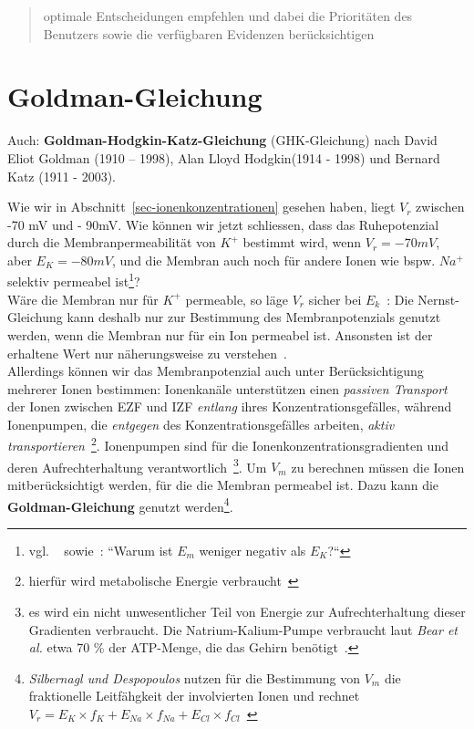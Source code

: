 {\blockquote[{\cite[737]{RN09}}]{
    optimale Entscheidungen empfehlen und dabei die Prioritäten des Benutzers sowie die verfügbaren Evidenzen berücksichtigen
}


\section{Goldman-Gleichung}\label{appendix:goldman}

Auch: \textbf{Goldman-Hodgkin-Katz-Gleichung} (GHK-Gleichung) nach David Eliot Goldman (1910 – 1998), Alan Lloyd Hodgkin(1914 - 1998) und Bernard Katz (1911 - 2003).

Wie wir in Abschnitt~\ref{sec-ionenkonzentrationen} gesehen haben, liegt $V_r$ zwischen -70 mV und - 90mV. Wie können wir jetzt schliessen, dass das Ruhepotenzial durch die Membranpermeabilität von $K^+$ bestimmt wird, wenn $V_r = -70 mV$, aber $E_K = -80 mV$, und die Membran auch noch für andere Ionen wie bspw. $Na^+$ selektiv permeabel ist\footnote{
    vgl. ~\cite[77]{BCP18} sowie~\cite[44]{SD07}: ``Warum ist $E_m$ weniger negativ als $E_K${?}``
}? \\
Wäre die Membran nur für $K^+$ permeable, so läge $V_r$ sicher bei $E_k$~\cite[32]{SD07}: Die Nernst-Gleichung kann deshalb nur zur Bestimmung des Membranpotenzials genutzt werden, wenn die Membran nur für ein Ion permeabel ist. Ansonsten ist der erhaltene Wert nur näherungsweise zu verstehen~\cite[67]{FE19}.\\

Allerdings können wir das Membranpotenzial auch unter Berücksichtigung mehrerer Ionen bestimmen: Ionenkanäle unterstützen einen \textit{passiven Transport} der Ionen zwischen EZF und IZF \textit{entlang} ihres Konzentrationsgefälles, während Ionenpumpen, die \textit{entgegen} des Konzentrationsgefälles arbeiten, \textit{aktiv transportieren}~\cite[30]{Fro19}\footnote{
    hierfür wird metabolische Energie verbraucht~\cite[31]{Fro19}
}.
Ionenpumpen sind für die Ionenkonzentrationsgradienten und deren Aufrechterhaltung verantwortlich~\cite[76]{BCP18}\footnote{
    es wird ein nicht unwesentlicher Teil von Energie zur Aufrechterhaltung dieser Gradienten verbraucht. Die Natrium-Kalium-Pumpe verbraucht laut \textit{Bear et al.} etwa 70 \% der ATP-Menge, die das Gehirn benötigt~\cite[76]{BCP18}.
}.
Um $V_m$ zu berechnen müssen die Ionen mitberücksichtigt werden, für die die Membran permeabel ist.
Dazu kann die \textbf{Goldman-Gleichung} genutzt werden\footnote{
    \textit{Silbernagl und Despopoulos} nutzen für die Bestimmung von $V_m$ die fraktionelle Leitfähgkeit der involvierten Ionen und rechnet $V_r = E_K \times f_K + E_{Na}  \times f_{Na} + E_{Cl}  \times f_{Cl}$~\cite[32, 1.21]{SD07}
}.

}
